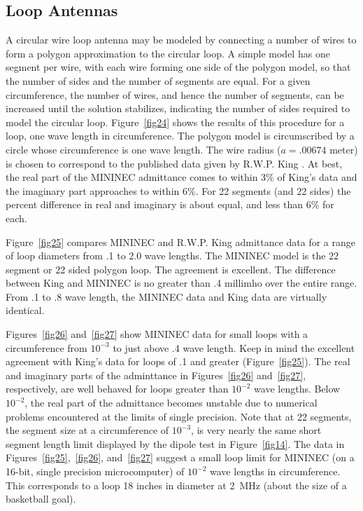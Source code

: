 \documentclass[12pt]{article}
\begin{document}
\subsection{Loop Antennas}
A circular wire loop antenna may be modeled by connecting a number of
wires to form a polygon approximation to the circular loop. A simple
model has one segment per wire, with each wire forming one side of the
polygon model, so that the number of sides and the number of segments
are equal. For a given circumference, the number of wires, and hence the
number of segments, can be increased until the solution stabilizes,
indicating the number of sides required to model the circular loop.
Figure~\ref{fig24} shows the results of this procedure for a loop, one
wave length in circumference. The polygon model is circumscribed by a
circle whose circumference is one wave length. The wire radius
($a=.00674$ meter) is chosen to correspond to the published data given
by R.W.P. King \cite{r9}. At best, the real part of the
MININEC admittance comes to within 3\% of King's data and the imaginary
part approaches to within 6\%. For 22 segments (and 22 sides) the
percent difference in real and imaginary is about equal, and less than
6\% for each.

Figure~\ref{fig25} compares MININEC and R.W.P. King admittance data for
a range of loop diameters from .1 to 2.0 wave lengths. The MININEC model
is the 22 segment or 22 sided polygon loop. The agreement is excellent.
The difference between King and MININEC is no greater than .4 millimho
over the entire range. From .1 to .8 wave length, the MININEC data and
King data are virtually identical.

Figures~\ref{fig26} and~\ref{fig27} show MININEC data for small loops
with a circumference from $10^{-3}$ to just above .4 wave length. Keep
in mind the excellent agreement with King's data for loops of .1 and
greater (Figure~\ref{fig25}). The real and imaginary parts of the
adminttance in Figures~\ref{fig26} and~\ref{fig27}, respectively, are
well behaved for loops greater than $10^{-2}$ wave lengths. Below
$10^{-2}$, the real part of the admittance becomes unstable due to
numerical problems encountered at the limits of single precision. Note
that at 22 segments, the segment size at a circumference of $10^{-3}$,
is very nearly the same short segment length limit displayed by the
dipole test in Figure~\ref{fig14}. The data in
Figures~\ref{fig25},~\ref{fig26}, and~\ref{fig27} suggest a small loop
limit for MININEC (on a 16-bit, single precision microcomputer) of
$10^{-2}$ wave lengths in circumference. This corresponds to a loop 18
inches in diameter at 2~MHz (about the size of a basketball goal).
\end{document}
